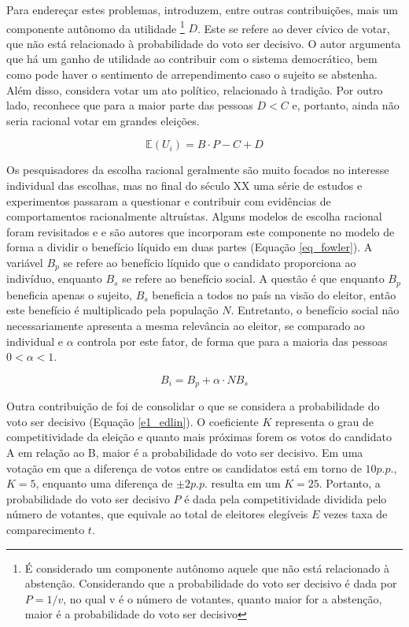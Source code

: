 Para endereçar estes problemas, \textcite{riker1968theory} introduzem, entre outras contribuições, mais um componente autônomo da utilidade
\footnote{É considerado um componente autônomo aquele que não está relacionado à abstenção. Considerando que a probabilidade do voto ser decisivo é dada por $P = 1/v$, no qual v é o número de votantes, quanto maior for a abstenção, maior é a probabilidade do voto ser decisivo}
$D$. Este se refere ao dever cívico de votar, que não está relacionado à probabilidade do voto ser decisivo. O autor argumenta que há um ganho de utilidade ao contribuir com o sistema democrático, bem como pode haver o sentimento de arrependimento caso o sujeito se abstenha. Além disso, considera votar um ato político, relacionado à tradição. Por outro lado, reconhece que para a maior parte das pessoas $D<C$ e, portanto, ainda não seria racional votar em grandes eleições.

\begin{equation}
\label{eq_riker}
    \mathbb{E}(U_i)=B\cdot P-C+D
\end{equation}

Os pesquisadores da escolha racional geralmente são muito focados no interesse individual das escolhas, mas no final do século XX uma série de estudos e experimentos passaram a questionar e contribuir com evidências de comportamentos racionalmente altruístas. Alguns modelos de escolha racional foram revisitados e \textcite{fowler2006altruism} e \textcite{edlin2007voting} são autores que incorporam este componente no modelo de forma a dividir o benefício líquido em duas partes (Equação \ref{eq_fowler}). A variável $B_p$ se refere ao benefício líquido que o candidato proporciona ao indivíduo, enquanto $B_s$ se refere ao benefício social. A questão é que enquanto $B_p$ beneficia apenas o sujeito, $B_s$ beneficia a todos no país na visão do eleitor, então este benefício é multiplicado pela população $N$. Entretanto, o benefício social não necessariamente apresenta a mesma relevância ao eleitor, se comparado ao individual e $\alpha$ controla por este fator, de forma que para a maioria das pessoas $0<\alpha < 1$.

\begin{equation}
\label{eq_fowler}
    B_i = B_p + \alpha\cdot NB_s
\end{equation}

Outra contribuição de \textcite{edlin2007voting} foi de consolidar o que se considera a probabilidade do voto ser decisivo (Equação \ref{e1_edlin}). O coeficiente $K$ representa o grau de competitividade da eleição e quanto mais próximas forem os votos do candidato A em relação ao B, maior é a probabilidade do voto ser decisivo. Em uma votação em que a diferença de votos entre os candidatos está em torno de $10p.p$., $K=5$, enquanto uma diferença de $\pm 2p.p.$ resulta em um $K=25$. Portanto, a probabilidade do voto ser decisivo $P$ é dada pela competitividade dividida pelo número de votantes, que equivale ao total de eleitores elegíveis $E$ vezes taxa de comparecimento $t$.

